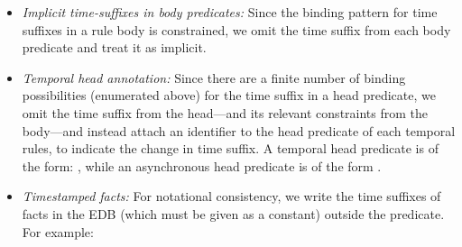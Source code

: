 \begin{itemize}
%
%
\item {\em Implicit time-suffixes in body predicates:} Since the binding pattern
for time suffixes in a rule body is constrained, we omit the time suffix from each body predicate and treat
it as implicit.
%
\item {\em Temporal head annotation:} Since there are a finite number of binding
possibilities (enumerated above) for the time suffix in a head predicate, we omit the time
suffix from the head---and its relevant constraints from the body---and
instead attach an identifier to the head predicate of each temporal rules, to indicate the change in
time suffix.  A temporal head predicate  is of the form: ,
while an asynchronous head predicate  is of the form .

\item {\em Timestamped facts:} For notational consistency, we write the time suffixes of facts in the EDB (which
must be given as a constant) outside the predicate.  For example:


%
%
%
%
%
\end{itemize}



